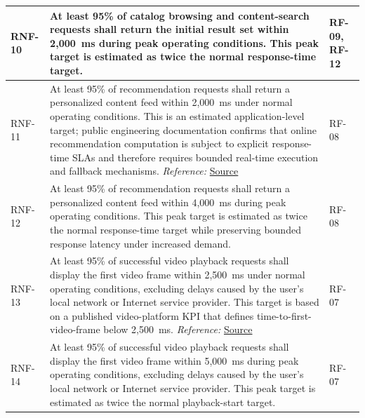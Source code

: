 \documentclass{article}
\begin{document}
\begin{table}[H]
\begin{tabularx}{\textwidth}{|p{2.2cm}|X|p{3.5cm}|}
RNF-10 &
At least 95\% of catalog browsing and content-search requests shall return the initial result set within 2{,}000~ms during peak operating conditions. This peak target is estimated as twice the normal response-time target.
&
RF-09, RF-12 \\ \hline

RNF-11 &
At least 95\% of recommendation requests shall return a personalized content feed within 2{,}000~ms under normal operating conditions. This is an estimated application-level target; public engineering documentation confirms that online recommendation computation is subject to explicit response-time SLAs and therefore requires bounded real-time execution and fallback mechanisms.
\textit{Reference:} \href{https://medium.com/netflix-techblog/system-architectures-for-personalization-and-recommendation-e081aa94b5d8}{Source}
&
RF-08 \\ \hline

RNF-12 &
At least 95\% of recommendation requests shall return a personalized content feed within 4{,}000~ms during peak operating conditions. This peak target is estimated as twice the normal response-time target while preserving bounded response latency under increased demand.
&
RF-08 \\ \hline

RNF-13 &
At least 95\% of successful video playback requests shall display the first video frame within 2{,}500~ms under normal operating conditions, excluding delays caused by the user's local network or Internet service provider. This target is based on a published video-platform KPI that defines time-to-first-video-frame below 2{,}500~ms.
\textit{Reference:} \href{https://www.developer.amazon.com/docs/vega/0.23/measure-app-kpis}{Source}
&
RF-07 \\ \hline

RNF-14 &
At least 95\% of successful video playback requests shall display the first video frame within 5{,}000~ms during peak operating conditions, excluding delays caused by the user's local network or Internet service provider. This peak target is estimated as twice the normal playback-start target.
&
RF-07 \\ \hline

\end{tabularx}

\end{table}


\end{document}

